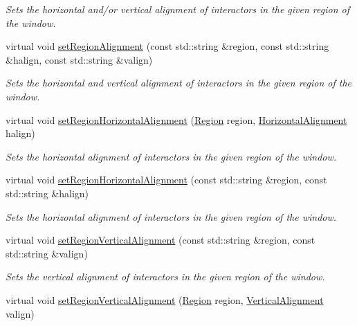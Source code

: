 \begin{DoxyCompactItemize}
\begin{DoxyCompactList}\small\item\em Sets the horizontal and/or vertical alignment of interactors in the given region of the window. \end{DoxyCompactList}\item 
virtual void \mbox{\hyperlink{classsgl_1_1GWindow_ad1c76be81b3b865f78b0e91f0e1f07d4}{set\+Region\+Alignment}} (const std\+::string \&region, const std\+::string \&halign, const std\+::string \&valign)
\begin{DoxyCompactList}\small\item\em Sets the horizontal and vertical alignment of interactors in the given region of the window. \end{DoxyCompactList}\item 
virtual void \mbox{\hyperlink{classsgl_1_1GWindow_aca8f01ef261afca9c843589e8be54134}{set\+Region\+Horizontal\+Alignment}} (\mbox{\hyperlink{classsgl_1_1GWindow_a81a01a86de31071a92e6cce0bab9bc4b}{Region}} region, \mbox{\hyperlink{namespacesgl_aa00e70829e72ff16addc4d9f06fe3bc5}{Horizontal\+Alignment}} halign)
\begin{DoxyCompactList}\small\item\em Sets the horizontal alignment of interactors in the given region of the window. \end{DoxyCompactList}\item 
virtual void \mbox{\hyperlink{classsgl_1_1GWindow_aefb97090ff4e149f8a0cce9efee3c451}{set\+Region\+Horizontal\+Alignment}} (const std\+::string \&region, const std\+::string \&halign)
\begin{DoxyCompactList}\small\item\em Sets the horizontal alignment of interactors in the given region of the window. \end{DoxyCompactList}\item 
virtual void \mbox{\hyperlink{classsgl_1_1GWindow_afbe22d897ce8ef25db52cbc3d456aa0a}{set\+Region\+Vertical\+Alignment}} (const std\+::string \&region, const std\+::string \&valign)
\begin{DoxyCompactList}\small\item\em Sets the vertical alignment of interactors in the given region of the window. \end{DoxyCompactList}\item 
virtual void \mbox{\hyperlink{classsgl_1_1GWindow_a1efb2d3b67fb479aad27a6c0032ee70e}{set\+Region\+Vertical\+Alignment}} (\mbox{\hyperlink{classsgl_1_1GWindow_a81a01a86de31071a92e6cce0bab9bc4b}{Region}} region, \mbox{\hyperlink{namespacesgl_a9c2ed22cfbd21f13df24ea193b310aee}{Vertical\+Alignment}} valign)

\end{DoxyCompactItemize}
